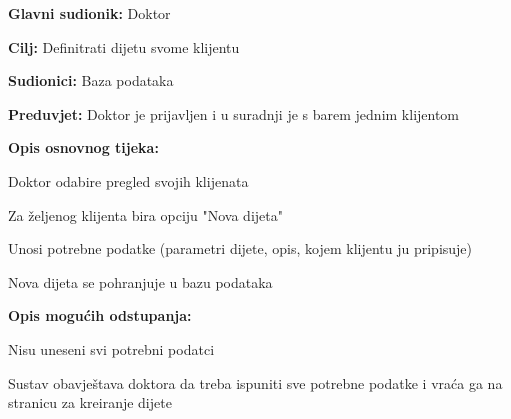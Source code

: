 				\noindent {}
				\begin{packed_item}
					
					\item \textbf{Glavni sudionik:} Doktor
					\item  \textbf{Cilj:} Definitrati dijetu svome klijentu
					\item  \textbf{Sudionici:} Baza podataka
					\item  \textbf{Preduvjet:} Doktor je prijavljen i u suradnji je s barem jednim klijentom
					\item  \textbf{Opis osnovnog tijeka:}
					
					\item[] \begin{packed_enum}
						
						\item Doktor odabire pregled svojih klijenata
						\item Za željenog klijenta bira opciju "Nova dijeta"
						\item Unosi potrebne podatke (parametri dijete, opis, kojem klijentu ju pripisuje) 
						\item Nova dijeta se pohranjuje u bazu podataka
						
					\end{packed_enum}
				
					\item  \textbf{Opis mogućih odstupanja:}
					
					\item[] \begin{packed_item}
						
						\item[3.a] Nisu uneseni svi potrebni podatci
						\item[] \begin{packed_enum}
							
							\item Sustav obavještava doktora da treba ispuniti sve potrebne podatke i vraća ga na stranicu za kreiranje dijete
						\end{packed_enum}
						
					\end{packed_item}
					
				\end{packed_item}
			
